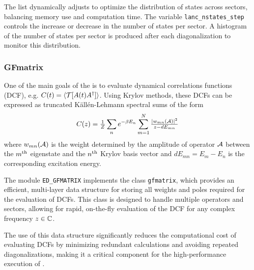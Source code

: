 \documentclass[edipack_sp.tex]{subfiles}
\begin{document}
The list dynamically adjusts to optimize the distribution of states 
across sectors, balancing memory use and computation time. The
variable \texttt{lanc\_nstates\_step} controls the increase or
decrease in the number of states per sector. 
A histogram  of the number of states per sector is produced after each diagonalization to monitor this distribution.



\subsubsection{GFmatrix}
One of the main goals of the \NAME is to evaluate dynamical correlations
functions (DCF), e.g. $C(t) = \ibra \TT[ A(t) A^\dagger ]\iket$. Using Krylov methods,
these DCFs can be expressed as truncated K\"all\'en-Lehmann spectral sums of the form
$$
C(z) = \tfrac{1}{Z}\sum_n e^{-\beta E_n} \sum_{m=1}^{N} \tfrac{|w_{mn}(\AA)|^2}{ z
  - dE_{mn}}
$$
where $w_{mn}(\AA)$ is the weight determined by the amplitude of operator $\AA$ between the
$m^{\rm th}$ eigenstate and the $n^{\rm th}$ Krylov basis vector and
$dE_{mn}=E_m-E_n$ is the corresponding excitation energy.

The module {\tt ED\_GFMATRIX} implements the class {\tt gfmatrix}, 
which provides an efficient, multi-layer data structure for storing 
all weights and poles required for the evaluation of DCFs. This 
class is designed to handle multiple operators and sectors, allowing 
for rapid, on-the-fly evaluation of the DCF for any complex frequency 
$z\in\CCC$.

The use of this data structure significantly reduces the computational 
cost of evaluating DCFs by minimizing redundant calculations and 
avoiding repeated diagonalizations, making it a critical component 
for the high-performance execution of \NAME.
\end{document}
